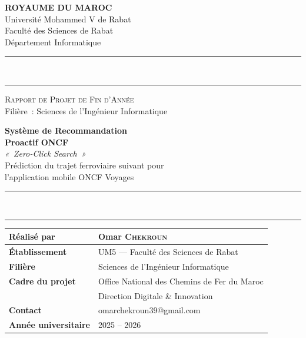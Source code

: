 \documentclass[11pt, a4paper]{article}
\begin{document}

\begin{titlepage}
\thispagestyle{empty}
\begin{center}

\vspace*{0.3cm}
{\large \textbf{ROYAUME DU MAROC}}\\[0.15cm]
{\normalsize Université Mohammed V de Rabat}\\[0.1cm]
{\normalsize Faculté des Sciences de Rabat}\\[0.1cm]
{\normalsize Département Informatique}\\[0.6cm]

\noindent\rule{\textwidth}{1.2pt}
\vspace{0.05cm}\\
\noindent\rule{\textwidth}{0.4pt}

\vspace{1.5cm}
{\small \textsc{Rapport de Projet de Fin d'Année}}\\[0.4cm]
{\small Filière~: Sciences de l'Ingénieur Informatique}

\vspace{2.0cm}
{\Huge \textbf{Système de Recommandation}}\\[0.3cm]
{\Huge \textbf{Proactif ONCF}}\\[0.6cm]
{\Large \textit{«~Zero-Click Search~»}}\\[0.3cm]
{\large Prédiction du trajet ferroviaire suivant pour}\\[0.1cm]
{\large l'application mobile ONCF Voyages}

\vspace{2.0cm}

\noindent\rule{\textwidth}{0.4pt}
\vspace{0.05cm}\\
\noindent\rule{\textwidth}{1.2pt}

\vspace{0.8cm}
\begin{tabularx}{0.85\textwidth}{|l|X|}
\hline
\textbf{Réalisé par}        & Omar \textsc{Chekroun} \\
\hline
\textbf{Établissement}      & UM5 --- Faculté des Sciences de Rabat \\
\hline
\textbf{Filière}            & Sciences de l'Ingénieur Informatique \\
\hline
\textbf{Cadre du projet}    & Office National des Chemins de Fer du Maroc \\
                            & Direction Digitale \& Innovation \\
\hline
\textbf{Contact}            & omarchekroun39@gmail.com \\
\hline
\textbf{Année universitaire}& 2025 -- 2026 \\
\hline
\end{tabularx}


\end{center}
\end{titlepage}
\end{document}
